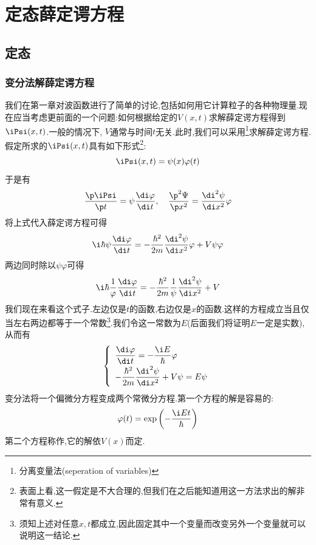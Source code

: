 \documentclass{ctexart}
\begin{document}
\section{定态薛定谔方程}
\subsection{定态}
\subsubsection{变分法解薛定谔方程}
我们在第一章对波函数进行了简单的讨论,包括如何用它计算粒子的各种物理量.现在应当考虑更前面的一个问题:如何根据给定的$V(x,t)$求解薛定谔方程得到$\iPsi(x,t)$.一般的情况下, $V$通常与时间$t$无关.此时,我们可以采用\footnote{分离变量法(seperation of variables)}求解薛定谔方程.假定所求的$\iPsi(x,t)$具有如下形式\footnote{表面上看,这一假定是不大合理的,但我们在之后能知道用这一方法求出的解非常有意义.}:
\[\iPsi(x,t)=\psi(x)\varphi(t)\]
于是有
\[\dfrac{\p\iPsi}{\p t}=\psi\dfrac{\di\varphi}{\di t},\quad\dfrac{\p^2\Psi}{\p x^2}=\dfrac{\di^2\psi}{\di x^2}\varphi\]
将上式代入薛定谔方程可得
\[\i\hbar\psi\dfrac{\di\varphi}{\di t}=-\dfrac{\hbar^2}{2m}\dfrac{\di^2\psi}{\di x^2}\varphi+V\psi\varphi\]
两边同时除以$\psi\varphi$可得
\[\i\hbar\dfrac{1}{\varphi}\dfrac{\di\varphi}{\di t}=-\dfrac{\hbar^2}{2m}\dfrac{1}{\psi}\dfrac{\di^2\psi}{\di x^2}+V\]
我们现在来看这个式子.左边仅是$t$的函数,右边仅是$x$的函数.这样的方程成立当且仅当左右两边都等于一个常数\footnote{须知上述对任意$x,t$都成立,因此固定其中一个变量而改变另外一个变量就可以说明这一结论.}.我们令这一常数为$E$(后面我们将证明$E$一定是实数),从而有
\[\left\{\begin{array}{l}
    \dfrac{\di\varphi}{\di t}=-\dfrac{\i E}{\hbar}\varphi\\[6pt]
    -\dfrac{\hbar^2}{2m}\dfrac{\di^2\psi}{\di x^2}+V\psi=E\psi
\end{array}\right.\]
变分法将一个偏微分方程变成两个常微分方程.第一个方程的解是容易的:
\[\varphi(t)=\exp\left(-\dfrac{\i Et}{\hbar}\right)\]
第二个方程称作,它的解依$V(x)$而定.
\end{document}
